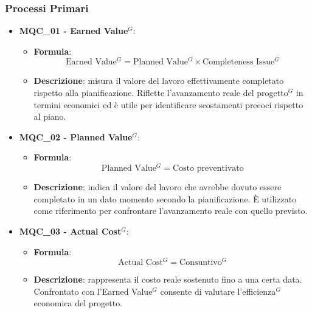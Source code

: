 \subsubsection{Processi Primari}
\begin{itemize}
\item \textbf{MQC\_01 - Earned Value$^G$}:
    \begin{itemize}
        \item \textbf{Formula}:
        \[
            \text{Earned Value$^G$} =
            \text{Planned Value$^G$} \times \text{Completeness Issue$^G$}
        \]
        \item \textbf{Descrizione}: misura il valore del lavoro effettivamente completato rispetto alla pianificazione. Riflette l’avanzamento reale del progetto$^G$ in termini economici ed è utile per identificare scostamenti precoci rispetto al piano.
    \end{itemize}

\item \textbf{MQC\_02 - Planned Value$^G$}:
    \begin{itemize}
        \item \textbf{Formula}:
        \[
            \text{Planned Value$^G$} = \text{Costo preventivato}
        \]
        \item \textbf{Descrizione}: indica il valore del lavoro che avrebbe dovuto essere completato in un dato momento secondo la pianificazione. È utilizzato come riferimento per confrontare l’avanzamento reale con quello previsto.
    \end{itemize}

\item \textbf{MQC\_03 - Actual Cost$^G$}:
    \begin{itemize}
        \item \textbf{Formula}:
        \[
            \text{Actual Cost$^G$} = \text{Consuntivo$^G$}
        \]
        \item \textbf{Descrizione}: rappresenta il costo reale sostenuto fino a una certa data. Confrontato con l’Earned Value$^G$ consente di valutare l’efficienza$^G$ economica del progetto.
    \end{itemize}


\end{itemize}
